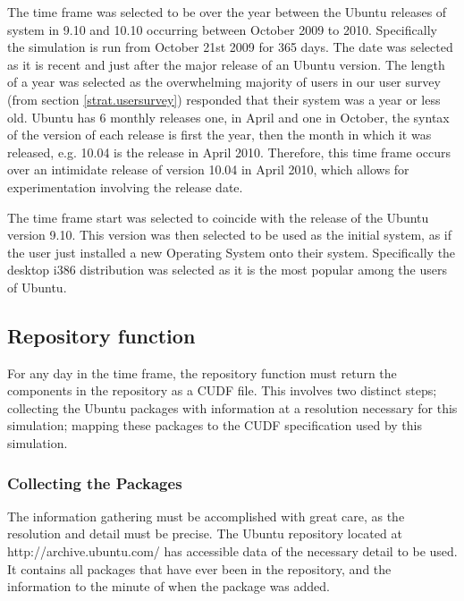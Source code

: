 The time frame was selected to be over the year between the Ubuntu releases of system in 9.10 and 10.10 occurring between October 2009 to 2010.
Specifically the simulation is run from October 21st 2009 for 365 days.
The date was selected as it is recent and just after the major release of an Ubuntu version.
The length of a year was selected as the overwhelming majority of users in our user survey (from section \ref{strat.usersurvey}) responded that their system was a year or less old.
Ubuntu has 6 monthly releases one, in April and one in October, the syntax of the version of each release is first the year,
then the month in which it was released, e.g. 10.04 is the release in April 2010.
Therefore, this time frame occurs over an intimidate release of version 10.04 in April 2010, which allows for experimentation involving the release date.

The time frame start was selected to coincide with the release of the Ubuntu version 9.10.
This version was then selected to be used as the initial system, as if the user just installed a new Operating System onto their system.
Specifically the desktop i386 distribution was selected as it is the most popular among the users of Ubuntu.

\subsection{Repository function}
For any day in the time frame, the repository function must return the components in the repository as a CUDF file.
This involves two distinct steps; collecting the Ubuntu packages with information at a resolution necessary for this simulation;
mapping these packages to the CUDF specification used by this simulation.

\subsubsection{Collecting the Packages}
The information gathering must be accomplished with great care, as the resolution and detail must be precise.
The Ubuntu repository located at http://archive.ubuntu.com/ has accessible data of the necessary detail to be used.
It contains all packages that have ever been in the repository, and the information to the minute of when the package was added.

